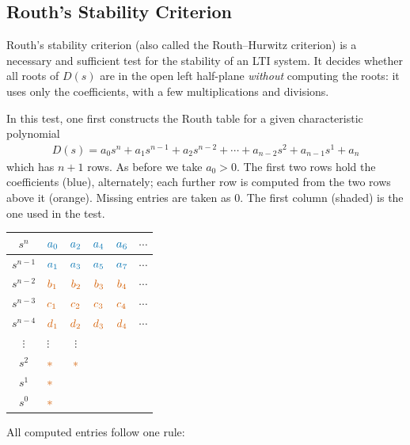 \documentclass[twoside]{article}
\newcommand{\RA}[1]{\textcolor{rgiv}{#1}}
\newcommand{\RC}[1]{\textcolor{rcmp}{#1}}
\renewcommand{\arraystretch}{1.35}
\begin{document}
\subsection{Routh's Stability Criterion} 

Routh's stability criterion (also called the Routh--Hurwitz criterion) is a necessary and
sufficient test for the stability of an LTI system. It decides whether all roots of $D(s)$ are
in the open left half-plane \emph{without} computing the roots: it uses only the coefficients,
with a few multiplications and divisions.

In this test, one first constructs the Routh table for a given characteristic polynomial
%
\begin{align*}
D(s) = a_0 s^n + a_1 s^{n-1} + a_2 s^{n-2} + \cdots + a_{n-2} s^{2}
+ a_{n-1} s^{1} + a_n 
\end{align*}  
%
which has $n+1$ rows. As before we take $a_0 > 0$. The first two rows hold the coefficients
(\RA{blue}), alternately; each further row is computed from the two rows above it (\RC{orange}).
Missing entries are taken as $0$. The first column (shaded) is the one used in the test.
%
\begin{center}
\renewcommand{\arraystretch}{1.25}
\begin{tabular}{|c || F || c c c c |}
\hline
$s^n$ & $\RA{a_0}$ & $\RA{a_2}$ & $\RA{a_4}$ & $\RA{a_6}$ & $\cdots$
\\ \hline
$s^{n-1}$ & $\RA{a_1}$ & $\RA{a_3}$ & $\RA{a_5}$ & $\RA{a_7}$ & $\cdots$
\\ \hline
$s^{n-2}$ & $\RC{b_1}$ & $\RC{b_2}$ & $\RC{b_3}$ & $\RC{b_4}$ & $\cdots$
\\ \hline
$s^{n-3}$ & $\RC{c_1}$ & $\RC{c_2}$ & $\RC{c_3}$ & $\RC{c_4}$ & $\cdots$
\\ \hline
$s^{n-4}$ & $\RC{d_1}$ & $\RC{d_2}$ & $\RC{d_3}$ & $\RC{d_4}$ & $\cdots$
\\ \hline
$\vdots$ & $\vdots$ & $\vdots$ & & &
\\ \hline
$s^{2}$ & $\RC{\ast}$ & $\RC{\ast}$ & & &
\\ \hline
$s^{1}$ & $\RC{\ast}$ & & & &
\\ \hline
$s^{0}$ & $\RC{\ast}$ & & & &
\\ \hline
\end{tabular}
\end{center}

All computed entries follow one rule:
\end{document}
